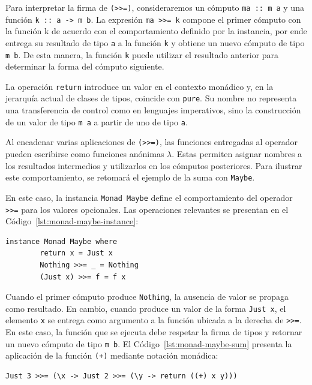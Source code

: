 Para interpretar la firma de \verb|(>>=)|, consideraremos un cómputo \verb|ma :: m a| y una función \verb|k :: a -> m b|. La expresión \verb|ma >>= k| compone el primer cómputo con la función k de acuerdo con el comportamiento definido por la instancia, por ende entrega su resultado de tipo \verb|a| a la función \verb|k| y obtiene un nuevo cómputo de tipo \verb|m b|. De esta manera, la función \verb|k| puede utilizar el resultado anterior para determinar la forma del cómputo siguiente.

La operación \verb|return| introduce un valor en el contexto monádico y, en la jerarquía actual de clases de tipos, coincide con \verb|pure|. Su nombre no representa una transferencia de control como en lenguajes imperativos, sino la construcción de un valor de tipo \verb|m a| a partir de uno de tipo \verb|a|.

Al encadenar varias aplicaciones de \verb|(>>=)|, las funciones entregadas al operador pueden escribirse como funciones anónimas $\lambda$. Estas permiten asignar nombres a los resultados intermedios y utilizarlos en los cómputos posteriores. Para ilustrar este comportamiento, se retomará el ejemplo de la suma con \verb|Maybe|.

En este caso, la instancia \verb|Monad Maybe| define el comportamiento del operador \verb|>>=| para los valores opcionales. Las operaciones relevantes se presentan en el Código~\ref{lst:monad-maybe-instance}:

\begin{lstlisting}[style=haskell,caption={Instancia de \texttt{Monad} para \texttt{Maybe}.},label={lst:monad-maybe-instance}]
    instance Monad Maybe where
        return x = Just x
        Nothing >>= _ = Nothing
        (Just x) >>= f = f x
\end{lstlisting}

Cuando el primer cómputo produce \verb|Nothing|, la ausencia de valor se propaga como resultado. En cambio, cuando produce un valor de la forma \verb|Just x|, el elemento \verb|x| se entrega como argumento a la función ubicada a la derecha de \verb|>>=|. En este caso, la función que se ejecuta debe respetar la firma de tipos y retornar un nuevo cómputo de tipo \verb|m b|. El Código~\ref{lst:monad-maybe-sum} presenta la aplicación de la función \verb|(+)| mediante notación monádica:

\begin{lstlisting}[style=haskell,caption={Suma monádica de dos valores de tipo \texttt{Maybe}.},label={lst:monad-maybe-sum}]
    Just 3 >>= (\x -> Just 2 >>= (\y -> return ((+) x y)))
\end{lstlisting}

